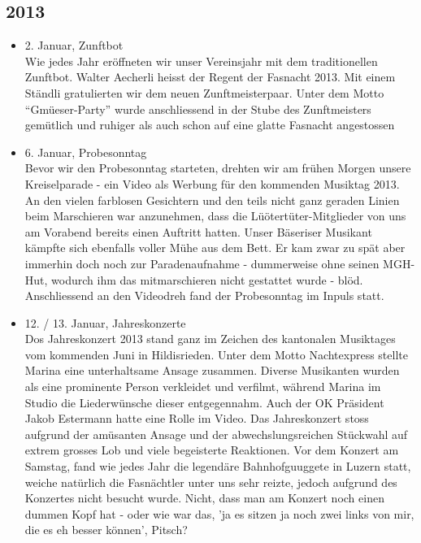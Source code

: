 \subsection{2013}
\begin{history}


    \begin{itemize}

        \item 2. Januar, Zunftbot\\
              Wie jedes Jahr eröffneten wir unser Vereinsjahr mit dem traditionellen
              Zunftbot. Walter Aecherli heisst der Regent der Fasnacht 2013. Mit einem
              Ständli gratulierten wir dem neuen Zunftmeisterpaar. Unter dem Motto
              \enquote{Gmüeser-Party} wurde anschliessend in der Stube des
              Zunftmeisters gemütlich und ruhiger als auch schon auf eine glatte
              Fasnacht angestossen

        \item 6. Januar, Probesonntag\\
              Bevor wir den Probesonntag starteten, drehten wir am frühen Morgen
              unsere Kreiselparade - ein Video als Werbung für den kommenden Musiktag
              2013. An den vielen farblosen Gesichtern und den teils nicht ganz
              geraden Linien beim Marschieren war anzunehmen, dass die
              Lüötertüter-Mitglieder von uns am Vorabend bereits einen Auftritt
              hatten. Unser Bäseriser Musikant kämpfte sich ebenfalls voller Mühe aus
              dem Bett. Er kam zwar zu spät aber immerhin doch noch zur
              Paradenaufnahme - dummerweise ohne seinen MGH-Hut, wodurch ihm das
              mitmarschieren nicht gestattet wurde - blöd. Anschliessend an den
              Videodreh fand der Probesonntag im Inpuls statt.

        \item 12. / 13. Januar, Jahreskonzerte\\
              Dos Jahreskonzert 2013 stand ganz im Zeichen des kantonalen Musiktages
              vom kommenden Juni in Hildisrieden. Unter dem Motto Nachtexpress stellte
              Marina eine unterhaltsame Ansage zusammen. Diverse Musikanten wurden als
              eine prominente Person verkleidet und verfilmt, während Marina im Studio
              die Liederwünsche dieser entgegennahm. Auch der OK Präsident Jakob
              Estermann hatte eine Rolle im Video. Das Jahreskonzert stoss aufgrund
              der amüsanten Ansage und der abwechslungsreichen Stückwahl auf extrem
              grosses Lob und viele begeisterte Reaktionen. Vor dem Konzert am
              Samstag, fand wie jedes Jahr die legendäre Bahnhofguuggete in Luzern
              statt, weiche natürlich die Fasnächtler unter uns sehr reizte, jedoch
              aufgrund des Konzertes nicht besucht wurde. Nicht, dass man am Konzert
              noch einen dummen Kopf hat - oder wie war das, 'ja es sitzen ja noch
              zwei links von mir, die es eh besser können’, Pitsch?


\end{itemize}
\end{history}
